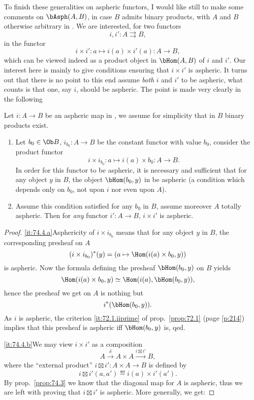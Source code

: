 To finish these generalities on aspheric functors, I would
like still to make some comments on $\bAsph(A,B)$, in case $B$ admits
binary products, with $A$ and $B$ otherwise arbitrary in \Cat. We are
interested, for two functors
\[ i,i' : A \rightrightarrows B,\]
in the functor
\[ i\times i': a\mapsto i(a)\times i'(a) : A \to B,\]
which can be viewed indeed as a product object in $\bHom(A,B)$ of $i$
and $i'$. Our interest here is mainly to give conditions ensuring that
$i\times i'$ is aspheric. It turns out that there is no point to this
end assume \emph{both} $i$ and $i'$ to be aspheric, what counts is
that one, say $i$, should be aspheric. The point is made very clearly
in the following
\begin{propositionnum}\label{prop:74.4}
  Let $i:A\to B$ be an aspheric map in \Cat, we assume for simplicity
  that in $B$ binary products exist.
  \begin{enumerate}[label=\alph*),font=\normalfont]
  \item\label{it:74.4.a}
    Let $b_0\in\Ob B$, $i_{b_0}:A\to B$ be the constant functor with
    value $b_0$, consider the product functor
    \[ i\times i_{b_0} : a\mapsto i(a)\times b_0 : A\to B.\]
    In order for this functor to be aspheric, it is necessary and
    sufficient that for any object $y$ in $B$, the object
    $\bHom(b_0,y)$ in \Bhat{} be aspheric \textup(a condition which
    depends only on $b_0$, not upon $i$ nor even upon $A$\textup).
  \item\label{it:74.4.b}
    Assume this condition satisfied for any $b_0$ in $B$, assume
    moreover $A$ totally aspheric. Then for \emph{any} functor
    $i':A\to B$, $i\times i'$ is aspheric.
  \end{enumerate}
\end{propositionnum}
\begin{proof}
  \ref{it:74.4.a}\enspace Asphericity of $i\times i_{b_0}$ means that
  for any object $y$ in $B$, the corresponding presheaf on $A$
  \[ (i\times i_{b_0})^*(y) = (a \mapsto \Hom(i(a)\times b_0, y))\]
  is aspheric. Now the formula defining the presheaf $\bHom(b_0,y)$ on
  $B$ yields
  \[ \Hom(i(a)\times b_0,y) \simeq \Hom(i(a),\bHom(b_0,y)),\]
  hence the presheaf we get on $A$ is nothing but
  \[i^*(\bHom(b_0,y)).\]
  As $i$ is aspheric, the criterion \ref{it:72.1.iiprime} of prop.\
  \ref{prop:72.1} (page \ref{p:214}) implies that this presheaf is
  aspheric if{f} $\bHom(b_0,y)$ is, qed.

  \ref{it:74.4.b}\enspace We may view $i\times i'$ as a composition
  \[ A \xrightarrow\delta A\times A \xrightarrow{i\boxtimes i'} B,\]
  where the ``external product'' $i\boxtimes i': A\times A\to B$ is
  defined by\pspage{229}
  \[{i\boxtimes i'}(a,a') \eqdef i(a)\times i'(a').\]
  By prop.\ \ref{prop:74.3} we know that the diagonal map for $A$ is
  aspheric, thus we are left with proving that $i\boxtimes i'$ is
  aspheric. More generally, we get:
\end{proof}
